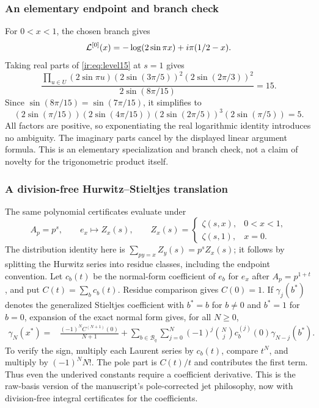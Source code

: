 \subsubsection{An elementary endpoint and branch check}
For $0<x<1$, the chosen branch gives
\[
 \mathcal L^{[0]}(x)=-\log(2\sin\pi x)+i\pi(1/2-x).
\]
Taking real parts of \eqref{ir:eq:level15} at $s=1$ gives
\[
 \frac{\prod_{u\in U}(2\sin\pi u)
 (2\sin(3\pi/5))^2(2\sin(2\pi/3))^2}
 {2\sin(8\pi/15)}=15.
\]
Since $\sin(8\pi/15)=\sin(7\pi/15)$, it simplifies to
\begin{equation}\label{ir:eq:sine-product}
 (2\sin(\pi/15))(2\sin(4\pi/15))
 (2\sin(2\pi/5))^3(2\sin(\pi/5))=5.
\end{equation}
All factors are positive, so exponentiating the real logarithmic identity
introduces no ambiguity. The imaginary parts cancel by the displayed
linear argument formula. This is an elementary specialization and branch
check, not a claim of novelty for the trigonometric product itself.

\subsubsection{A division-free Hurwitz--Stieltjes translation}
The same polynomial certificates evaluate under
\[
 A_p=p^s,\qquad e_x\mapsto Z_x(s),\qquad
 Z_x(s)=\begin{cases}\zeta(s,x),&0<x<1,\\\zeta(s,1),&x=0.\end{cases}
\]
The distribution identity here is
$\sum_{py=x}Z_y(s)=p^sZ_x(s)$; it follows by splitting the Hurwitz
series into residue classes, including the endpoint convention.
Let $c_b(t)$ be the normal-form coefficient of $e_b$ for $e_x$ after
$A_p=p^{1+t}$, and put $C(t)=\sum_b c_b(t)$.
Residue comparison gives $C(0)=1$. If
$\gamma_j(b^*)$ denotes the generalized Stieltjes coefficient with
$b^*=b$ for $b\ne0$ and $b^*=1$ for $b=0$, expansion of the exact
normal form gives, for all $N\ge0$,
\begin{align}
 \gamma_N(x^*)={}&
 \frac{(-1)^N C^{(N+1)}(0)}{N+1}
 +\sum_{b\in\mathcal B_q}\sum_{j=0}^{N}
 (-1)^j\binom Nj c_b^{(j)}(0)\gamma_{N-j}(b^*).
 \label{ir:eq:hurwitz-jets}
\end{align}
To verify the sign, multiply each Laurent series by $c_b(t)$, compare
$t^N$, and multiply by $(-1)^NN!$. The pole part is $C(t)/t$ and
contributes the first term. Thus even the underived constants require
a coefficient derivative. This is the raw-basis version of the
manuscript's pole-corrected jet philosophy, now with division-free
integral certificates for the coefficients.

